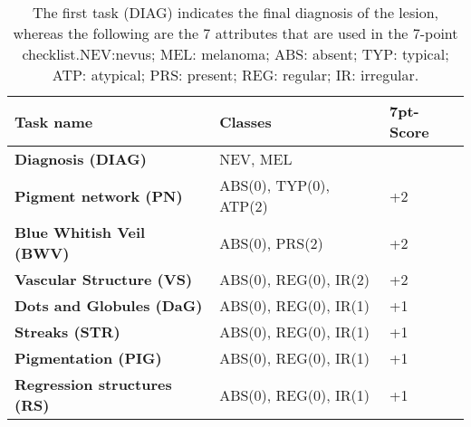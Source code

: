 \begin{table}[]
\begin{tabular}{ |p{6.2cm}|p{4.5cm}||p{1.6cm}|}
 \hline
 Task name & Classes & 7pt-Score \\
 \hline
 \textbf{Diagnosis (DIAG)} & NEV, MEL & \\\hline
 \textbf{Pigment network (PN)} & ABS(0), TYP(0), ATP(2) & +2\\\hline
 \textbf{Blue Whitish Veil (BWV)} & ABS(0), PRS(2) & +2\\\hline
 \textbf{Vascular Structure (VS)} & ABS(0), REG(0), IR(2) & +2 \\\hline
\textbf{Dots and Globules (DaG)} & ABS(0),  REG(0), IR(1) & +1 \\\hline
\textbf{Streaks (STR)} & ABS(0),  REG(0), IR(1) & +1 \\\hline
\textbf{Pigmentation (PIG)} & ABS(0),  REG(0), IR(1) & +1 \\\hline
\textbf{Regression structures (RS)} & ABS(0),  REG(0), IR(1) & +1 \\
\hline
\end{tabular}
\caption{The first task (DIAG) indicates the final diagnosis of the lesion, whereas the following are the 7 attributes that are used
in the 7-point checklist.NEV:nevus; MEL: melanoma; ABS: absent; TYP: typical; ATP: atypical; PRS: present; REG: regular; IR: irregular.}
\label{table:3}
\end{table}
